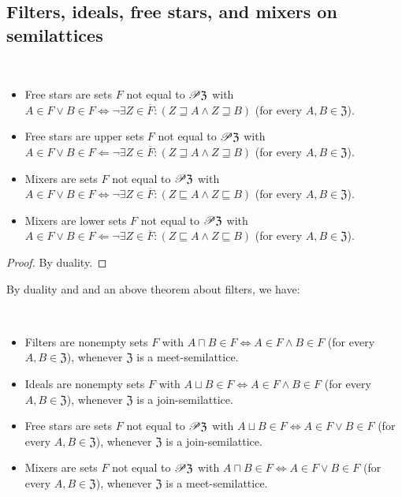 \subsection{Filters, ideals, free stars, and mixers on semilattices}
\begin{prop}
~
\begin{itemize}
\item Free stars are sets $F$ not equal to $\mathscr{P}\mathfrak{Z}$ with
$A\in F\lor B\in F\Leftrightarrow\lnot\exists Z\in\overline{F}:(Z\sqsupseteq A\wedge Z\sqsupseteq B)$
(for every $A,B\in\mathfrak{Z}$).
\item Free stars are upper sets $F$ not equal to $\mathscr{P}\mathfrak{Z}$
with $A\in F\lor B\in F\Leftarrow\lnot\exists Z\in\overline{F}:(Z\sqsupseteq A\wedge Z\sqsupseteq B)$
(for every $A,B\in\mathfrak{Z}$).
\item Mixers are sets $F$ not equal to $\mathscr{P}\mathfrak{Z}$ with $A\in F\lor B\in F\Leftrightarrow\lnot\exists Z\in\overline{F}:(Z\sqsubseteq A\wedge Z\sqsubseteq B)$
(for every $A,B\in\mathfrak{Z}$).
\item Mixers are lower sets $F$ not equal to $\mathscr{P}\mathfrak{Z}$ with
$A\in F\lor B\in F\Leftarrow\lnot\exists Z\in\overline{F}:(Z\sqsubseteq A\wedge Z\sqsubseteq B)$
(for every $A,B\in\mathfrak{Z}$).
\end{itemize}
\end{prop}
\begin{proof}
By duality.
\end{proof}
By duality and and an above theorem about filters, we have:
\begin{prop}
~
\begin{itemize}
\item Filters are nonempty sets $F$ with $A\sqcap B\in F\Leftrightarrow A\in F\land B\in F$
(for every $A,B\in\mathfrak{Z}$), whenever $\mathfrak{Z}$ is a meet-semilattice.
\item Ideals are nonempty sets $F$ with $A\sqcup B\in F\Leftrightarrow A\in F\land B\in F$
(for every $A,B\in\mathfrak{Z}$), whenever $\mathfrak{Z}$ is a join-semilattice.
\item Free stars are sets $F$ not equal to $\mathscr{P}\mathfrak{Z}$ with
$A\sqcup B\in F\Leftrightarrow A\in F\lor B\in F$ (for every $A,B\in\mathfrak{Z}$),
whenever $\mathfrak{Z}$ is a join-semilattice.
\item Mixers are sets $F$ not equal to $\mathscr{P}\mathfrak{Z}$ with $A\sqcap B\in F\Leftrightarrow A\in F\lor B\in F$
(for every $A,B\in\mathfrak{Z}$), whenever $\mathfrak{Z}$ is a meet-semilattice.
\end{itemize}
\end{prop}
